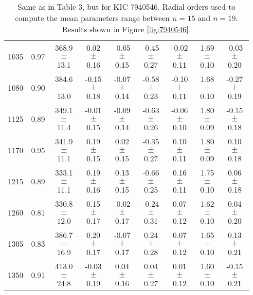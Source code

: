 \documentclass[twocolumn]{aastex61}%
\begin{document}
\begin{table*}[ht]
\begin{tabular}{ccc|ccccc|c}
1035 & 0.97 & 368.9 $\pm$ 13.1 & 0.02 $\pm$ 0.16 & -0.05 $\pm$ 0.15 & -0.45 $\pm$ 0.27 & -0.02 $\pm$ 0.11 & 1.69 $\pm$ 0.10 & -0.03 $\pm$ 0.20\\
1080 & 0.90 & 384.6 $\pm$ 13.0 & -0.15 $\pm$ 0.18 & -0.07 $\pm$ 0.14 & -0.58 $\pm$ 0.23 & -0.10 $\pm$ 0.11 & 1.68 $\pm$ 0.10 & -0.27 $\pm$ 0.19\\
1125 & 0.89 & 349.1 $\pm$ 11.4 & -0.01 $\pm$ 0.15 & -0.09 $\pm$ 0.14 & -0.63 $\pm$ 0.26 & -0.06 $\pm$ 0.10 & 1.80 $\pm$ 0.09 & -0.15 $\pm$ 0.18\\
1170 & 0.95 & 341.9 $\pm$ 11.1 & 0.19 $\pm$ 0.15 & 0.02 $\pm$ 0.15 & -0.35 $\pm$ 0.27 & 0.10 $\pm$ 0.11 & 1.80 $\pm$ 0.09 & 0.10 $\pm$ 0.18\\
1215 & 0.89 & 333.1 $\pm$ 11.1 & 0.19 $\pm$ 0.16 & 0.13 $\pm$ 0.15 & -0.66 $\pm$ 0.25 & 0.16 $\pm$ 0.11 & 1.75 $\pm$ 0.10 & 0.06 $\pm$ 0.18\\
1260 & 0.81 & 330.8 $\pm$ 12.0 & 0.15 $\pm$ 0.17 & -0.02 $\pm$ 0.17 & -0.24 $\pm$ 0.31 & 0.07 $\pm$ 0.12 & 1.62 $\pm$ 0.10 & 0.04 $\pm$ 0.20\\
1305 & 0.83 & 386.7 $\pm$ 16.9 & 0.20 $\pm$ 0.17 & -0.07 $\pm$ 0.17 & 0.24 $\pm$ 0.28 & 0.07 $\pm$ 0.12 & 1.65 $\pm$ 0.10 & 0.13 $\pm$ 0.21\\
1350 & 0.91 & 413.0 $\pm$ 24.8 & -0.03 $\pm$ 0.19 & 0.04 $\pm$ 0.16 & 0.04 $\pm$ 0.27 & 0.01 $\pm$ 0.12 & 1.60 $\pm$ 0.10 & -0.15 $\pm$ 0.21\\
\end{tabular}
\caption{Same as in Table 3, but for KIC 7940546. Radial orders used to compute the mean parameters range between $n=15$ and $n=19$. Results shown in Figure \ref{fig:7940546}.}\label{tab:7940546}
\end{table*}
\end{document}
